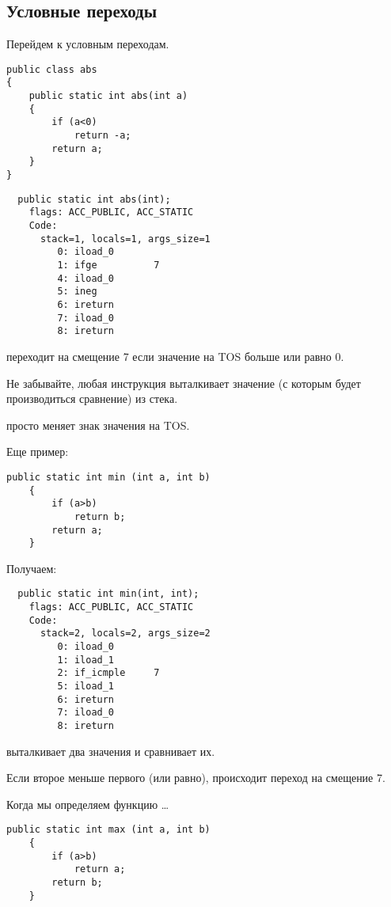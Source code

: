 \subsection{Условные переходы}

Перейдем к условным переходам.

\begin{lstlisting}[style=customjava]
public class abs
{
	public static int abs(int a)
	{
		if (a<0)
			return -a;
		return a;
	}
}
\end{lstlisting}

\begin{lstlisting}
  public static int abs(int);
    flags: ACC_PUBLIC, ACC_STATIC
    Code:
      stack=1, locals=1, args_size=1
         0: iload_0       
         1: ifge          7
         4: iload_0       
         5: ineg          
         6: ireturn       
         7: iload_0       
         8: ireturn       
\end{lstlisting}


 переходит на смещение 7 если значение на \ac{TOS} больше или равно 0.

Не забывайте, любая инструкция  выталкивает значение (с которым будет производиться
сравнение) из стека.


 просто меняет знак значения на \ac{TOS}.

Еще пример:

\begin{lstlisting}[style=customjava]
	public static int min (int a, int b)
	{
		if (a>b)
			return b;
		return a;
	}
\end{lstlisting}

Получаем:

\begin{lstlisting}
  public static int min(int, int);
    flags: ACC_PUBLIC, ACC_STATIC
    Code:
      stack=2, locals=2, args_size=2
         0: iload_0       
         1: iload_1       
         2: if_icmple     7
         5: iload_1       
         6: ireturn       
         7: iload_0       
         8: ireturn       
\end{lstlisting}

 выталкивает два значения и сравнивает их.

Если второе меньше первого (или равно), происходит переход на смещение 7.


Когда мы определяем функцию  \dots

\begin{lstlisting}[style=customjava]
	public static int max (int a, int b)
	{
		if (a>b)
			return a;
		return b;
	}
\end{lstlisting}


